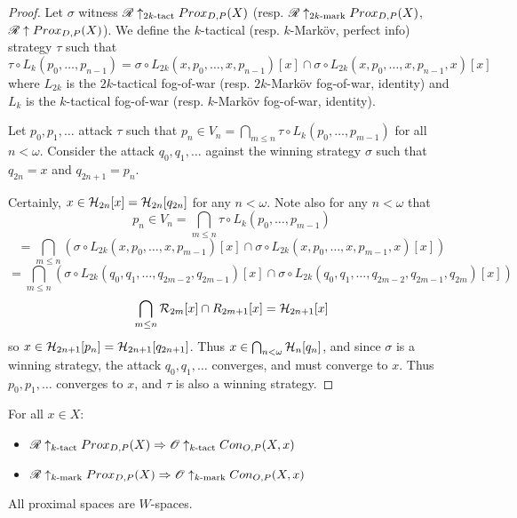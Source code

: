 \begin{proof}
Let $\sigma$ witness $\mathscr{R} \uparrow_{2k\text{-tact}}Prox_{D,P}(X)$ (resp. $\mathscr{R} \uparrow_{2k\text{-mark}}Prox_{D,P}(X)$, $\mathscr{R}\uparrow Prox_{D,P}(X)$). We define the $k$-tactical (resp. $k$-Mark\"ov, perfect info) strategy $\tau$ such that
  \[
    \tau\circ L_k(p_0,\dots,p_{n-1})
      =
    \sigma\circ L_{2k}(x,p_0,\dots,x,p_{n-1})[x]
      \cap
    \sigma\circ L_{2k}(x,p_0,\dots,x,p_{n-1},x)[x]
  \]
where $L_{2k}$ is the $2k$-tactical fog-of-war (resp. $2k$-Mark\"ov fog-of-war, identity) and $L_{k}$ is the $k$-tactical fog-of-war (resp. $k$-Mark\"ov fog-of-war, identity).

Let $p_0,p_1,\dots$ attack $\tau$ such that $p_n\in V_n=\bigcap_{m\leq n}\tau\circ L_k(p_0,\dots,p_{m-1})$ for all $n<\omega$. Consider the attack $q_0,q_1,\dots$ against the winning strategy $\sigma$ such that $q_{2n}=x$ and $q_{2n+1}=p_n$. 

Certainly, $x\in \mathcal{H}_{2n}[x]= \mathcal{H}_{2n}[q_{2n}]$ for any $n<\omega$. Note also for any $n<\omega$ that 
    \[
      p_n \in 
      V_n =
      \bigcap_{m\leq n}\tau\circ L_k(p_0,\dots,p_{m-1})
    \]
    \[
      =
      \bigcap_{m\leq n}\left(
        \sigma\circ L_{2k}(x,p_0,\dots,x,p_{m-1})[x]\cap
        \sigma\circ L_{2k}(x,p_0,\dots,x,p_{m-1},x)[x]
      \right)
    \]
    \[
      =
      \bigcap_{m\leq n}\left(
        \sigma\circ L_{2k}(q_0,q_1,\dots,q_{2m-2},q_{2m-1})[x]\cap
        \sigma\circ L_{2k}(q_0,q_1,\dots,q_{2m-2},q_{2m-1},q_{2m})[x]
      \right)
    \]
    \[
      \bigcap_{m\leq n}\mathcal{R}_{2m}[x]\cap R_{2m+1}[x]=
      \mathcal{H}_{2n+1}[x]
    \]
so $x\in\mathcal{H}_{2n+1}[p_n]=\mathcal{H}_{2n+1}[q_{2n+1}]$. Thus $x\in \bigcap_{n<\omega} \mathcal{H}_n[q_n]$, and since $\sigma$ is a winning strategy, the attack $q_0,q_1,\dots$ converges, and must converge to $x$. Thus $p_0,p_1,\dots$ converges to $x$, and $\tau$ is also a winning strategy.
\end{proof}

\begin{corollary}
For all $x\in X$:
  \begin{itemize}
    \item
      $\mathscr{R}\uparrow_{k\text{-tact}} Prox_{D,P}(X) \Rightarrow \mathscr{O} \uparrow_{k\text{-tact}} Con_{O,P}(X,x)$
    \item
      $\mathscr{R}\uparrow_{k\text{-mark}} Prox_{D,P}(X) \Rightarrow \mathscr{O} \uparrow_{k\text{-mark}} Con_{O,P}(X,x)$
  \end{itemize}
\end{corollary}

\begin{corollary}
   All proximal spaces are $W$-spaces.
\end{corollary}


